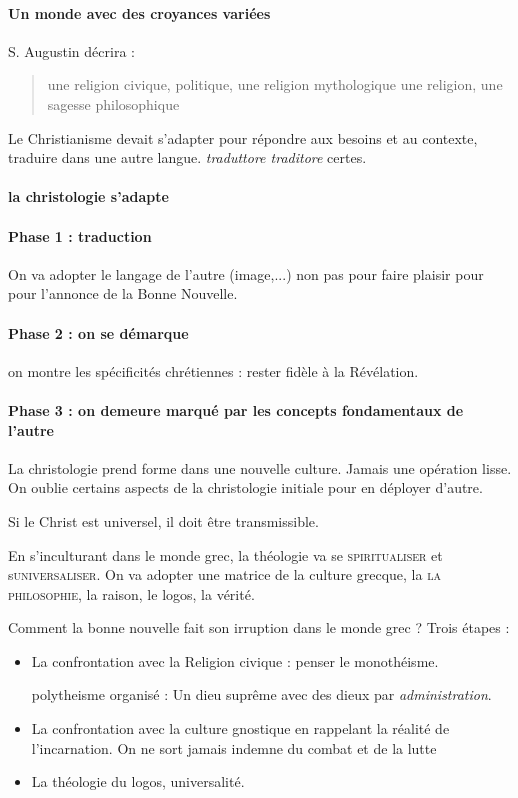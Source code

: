 \paragraph{Un monde avec des croyances variées} S. Augustin décrira :
\begin{quote}
    une religion civique, politique, 
    une religion mythologique
    une religion, une sagesse philosophique
\end{quote}
Le Christianisme devait s'adapter pour répondre aux besoins et au contexte, traduire dans une autre langue. \textit{traduttore traditore} certes.

\paragraph{la christologie s'adapte}
\paragraph{Phase 1 : traduction} On va adopter le langage de l'autre (image,...) non pas pour faire plaisir pour pour l'annonce de la Bonne Nouvelle. 
\paragraph{Phase 2 : on se démarque} on montre les spécificités chrétiennes : rester fidèle à la Révélation. 
\paragraph{Phase 3 : on demeure marqué par les concepts fondamentaux de l'autre} La christologie prend forme dans une nouvelle culture. Jamais une opération lisse. On oublie certains aspects de la christologie initiale pour en déployer d'autre.
\begin{Synthesis}
Si le Christ est universel, il doit être transmissible.
\end{Synthesis}

En s'inculturant dans le monde grec, la théologie va se \textsc{spiritualiser} et s\textsc{universaliser}. On va adopter une matrice de la culture grecque, la \textsc{la philosophie}, la raison, le logos, la vérité. 

Comment la bonne nouvelle fait son irruption dans le monde grec ?
Trois étapes : 
\begin{itemize}
    \item La confrontation avec la Religion civique : penser le monothéisme.
    \begin{Def}[hénotheisme]
    polytheisme organisé : Un dieu suprême avec des dieux par \textit{administration}. 
    \end{Def}
    \item La confrontation avec la culture gnostique en rappelant la réalité de l'incarnation. On ne sort jamais indemne du combat et de la lutte
    \item La théologie du logos, universalité. 
\end{itemize}

